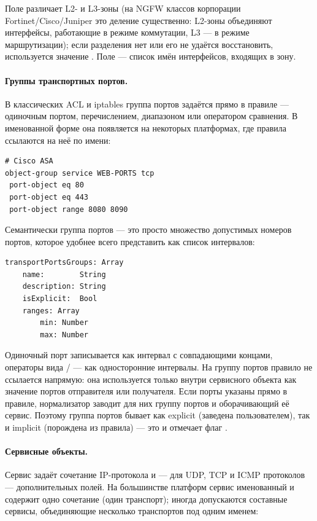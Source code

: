 Поле  различает L2- и L3-зоны (на NGFW классов корпорации Fortinet/Cisco/Juniper это деление существенно: L2-зоны объединяют интерфейсы, работающие в режиме коммутации, L3 --- в режиме маршрутизации); если разделения нет или его не удаётся восстановить, используется значение . Поле  --- список имён интерфейсов, входящих в зону.

\paragraph{Группы транспортных портов.} В классических ACL и iptables группа портов задаётся прямо в правиле --- одиночным портом, перечислением, диапазоном или оператором сравнения. В именованной форме она появляется на некоторых платформах, где правила ссылаются на неё по имени:

\begin{verbatim}
# Cisco ASA
object-group service WEB-PORTS tcp
 port-object eq 80
 port-object eq 443
 port-object range 8080 8090
\end{verbatim}

Семантически группа портов --- это просто множество допустимых номеров портов, которое удобнее всего представить как список интервалов:

\begin{lstlisting}[style=schemastyle]
transportPortsGroups: Array
    name:        String
    description: String
    isExplicit:  Bool
    ranges: Array
        min: Number
        max: Number
\end{lstlisting}

Одиночный порт записывается как интервал с совпадающими концами, операторы вида / --- как односторонние интервалы. На группу портов правило не ссылается напрямую: она используется только внутри сервисного объекта как значение портов отправителя или получателя. Если порты указаны прямо в правиле, нормализатор заводит для них группу портов и оборачивающий её сервис. Поэтому группа портов бывает как explicit (заведена пользователем), так и implicit (порождена из правила) --- это и отмечает флаг .

\paragraph{Сервисные объекты.} Сервис задаёт сочетание IP-протокола и --- для UDP, TCP и ICMP протоколов --- дополнительных полей. На большинстве платформ сервис именованный и содержит одно сочетание (один транспорт); иногда допускаются составные сервисы, объединяющие несколько транспортов под одним именем:

